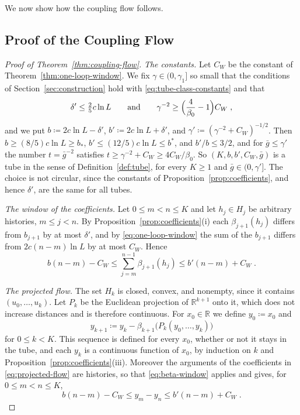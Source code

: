 \documentclass[11pt]{preprint}
\numberwithin{equation}{section}
\theoremstyle{definition}
\theoremstyle{remark}
\theoremstyle{plain}
\begin{document}
We now show how the coupling flow follows.

\subsection{Proof of the Coupling Flow}\label{sec:flow-proof}

\begin{proof}[Proof of Theorem~\ref{thm:coupling-flow}]
\emph{The constants.} Let $C_W$ be the constant of Theorem~\ref{thm:one-loop-window}. We fix $\gamma \in (0, \gamma_1]$ so small that the conditions of Section~\ref{sec:construction} hold with \eqref{eq:tube-class-constants} and that
\begin{equation}\label{eq:flow-gamma}
    \delta' \leq \tfrac{2}{5}c\ln L
    \qquad\text{and}\qquad
    \gamma^{-2} \geq \Bigl(\frac{4}{\beta_0} - 1\Bigr)C_W\;,
\end{equation}
and we put $b \coloneqq 2c\ln L - \delta'$, $b' \coloneqq 2c\ln L + \delta'$, and $\gamma' \coloneqq (\gamma^{-2} + C_W)^{-1/2}$. Then $b \geq (8/5)c\ln L \geq b_*$, $b' \leq (12/5)c\ln L \leq b^*$, and $b'/b \leq 3/2$, and for $\bar g \leq \gamma'$ the number $t = \bar g^{-2}$ satisfies $t \geq \gamma^{-2} + C_W \geq 4C_W/\beta_0$. So $(K, b, b', C_W, \bar g)$ is a tube in the sense of Definition~\ref{def:tube}, for every $K \geq 1$ and $\bar g \in (0, \gamma']$. The choice is not circular, since the constants of Proposition~\ref{prop:coefficients}, and hence $\delta'$, are the same for all tubes.

\emph{The window of the coefficients.} Let $0 \leq m < n \leq K$ and let $h_j \in H_j$ be arbitrary histories, $m \leq j < n$. By Proposition~\ref{prop:coefficients}(i) each $\beta_{j+1}(h_j)$ differs from $b_{j+1}$ by at most $\delta'$, and by \eqref{eq:one-loop-window} the sum of the $b_{j+1}$ differs from $2c(n - m)\ln L$ by at most $C_W$. Hence
\begin{equation}\label{eq:beta-window}
    b(n - m) - C_W \leq \sum_{j=m}^{n-1}\beta_{j+1}(h_j) \leq b'(n - m) + C_W\;.
\end{equation}

\emph{The projected flow.} The set $H_k$ is closed, convex, and nonempty, since it contains $(u_0, \dots, u_k)$. Let $P_k$ be the Euclidean projection of $\mathbb R^{k+1}$ onto it, which does not increase distances and is therefore continuous. For $x_0 \in \mathbb R$ we define $y_0 \coloneqq x_0$ and
\begin{equation}\label{eq:projected-flow}
    y_{k+1} \coloneqq y_k - \beta_{k+1}\bigl(P_k(y_0, \dots, y_k)\bigr)
\end{equation}
for $0 \leq k < K$. This sequence is defined for every $x_0$, whether or not it stays in the tube, and each $y_k$ is a continuous function of $x_0$, by induction on $k$ and Proposition~\ref{prop:coefficients}(iii). Moreover the arguments of the coefficients in \eqref{eq:projected-flow} are histories, so that \eqref{eq:beta-window} applies and gives, for $0 \leq m < n \leq K$,
\begin{equation}\label{eq:projected-window}
    b(n - m) - C_W \leq y_m - y_n \leq b'(n - m) + C_W\;.
\end{equation}


\end{proof}
\end{document}
